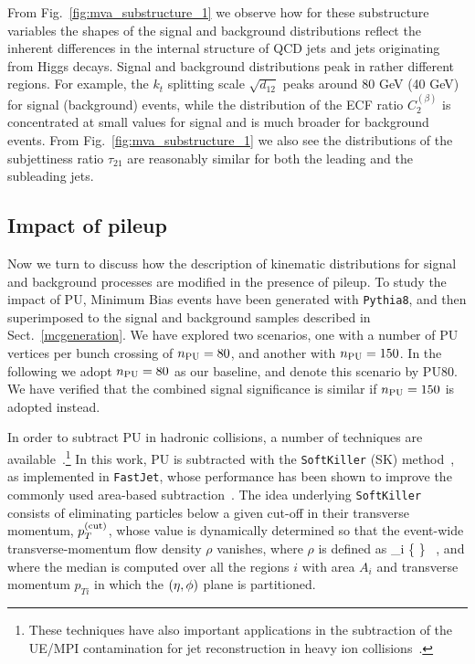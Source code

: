 From Fig.~\ref{fig:mva_substructure_1}
we observe how for these substructure variables the shapes of the signal
and background distributions reflect
the inherent differences in the internal structure of
QCD jets and jets originating from Higgs decays.
%
Signal and background distributions peak
in rather
different regions. For example, the $k_t$ splitting scale $\sqrt{d_{12}}$
peaks around 80 GeV (40 GeV) for signal (background) events, while
the distribution of the
ECF ratio $C_2^{(\beta)}$ is concentrated at small values
for signal and is much broader for background events.
%
From Fig.~\ref{fig:mva_substructure_1} we also see
the distributions of the subjettiness ratio $\tau_{21}$ are
reasonably similar
for both the leading and the subleading jets.
%

\subsection{Impact of pileup}
\label{sec:pileup}

Now we turn to discuss how the description of kinematic
distributions for signal
and background processes are
modified in the presence of pileup.
%
To study the impact of PU,
Minimum Bias events have been generated
with {\tt Pythia8}, and then
superimposed to the signal
and background samples described in Sect.~\ref{mcgeneration}.
%
We have explored two scenarios,
one with a number of
PU vertices per bunch crossing of $n_{\rm PU}=80$,
and another
with $n_{\rm PU}=150$.
%
In the following we adopt $n_{\rm PU}=80$ as our baseline,
and denote this scenario by PU80.
%
We have verified that the combined signal significance is
similar if $n_{\rm PU}=150$ is adopted instead.

%
In order to subtract PU in hadronic collisions, a number of techniques
are available~\cite{Cacciari:2009dp,TheATLAScollaboration:2013pia,Butterworth:2008iy,Cacciari:2007fd,Krohn:2009th,Krohn:2013lba,Cacciari:2008gd,Ellis:2009me,Bertolini:2014bba,Cacciari:2014gra,Cacciari:2014jta,Berta:2014eza,Larkoski:2014wba}.\footnote{
These techniques have also important applications in the subtraction
of the UE/MPI contamination for jet reconstruction
in heavy ion collisions~\cite{Cacciari:2010te}.
}
%
In this work, PU  is subtracted
with the {\tt SoftKiller} (SK)
method~\cite{Cacciari:2014gra}, as implemented in {\tt FastJet},
whose performance has been shown to
improve the commonly used area-based subtraction~\cite{Cacciari:2009dp}.
%
The idea underlying {\tt SoftKiller} consists of eliminating particles
below a given cut-off in their transverse momentum, $p_T^{\rm (cut)}$, whose
value is dynamically determined so that the event-wide
transverse-momentum flow density $\rho$ vanishes, where $\rho$ is
defined as
\be
\rho{}_i \Bigg\{ \Bigg\} \, ,
\ee
and where the median is computed over all the regions $i$ with area
$A_i$ and transverse momentum $p_{Ti}$ in which the $\left( \eta,\phi\right)$ plane
is partitioned.


